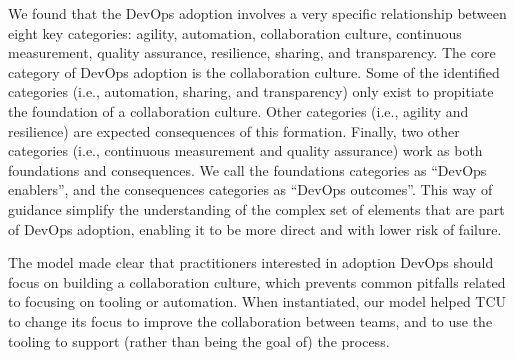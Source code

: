 


We found that the DevOps adoption involves a very specific relationship between
eight key categories: agility, automation, collaboration culture, continuous
measurement, quality assurance, resilience, sharing, and transparency. The core
category of DevOps adoption is the collaboration culture. Some of the
identified categories (i.e., automation, sharing, and transparency) only exist
to propitiate the foundation of a collaboration culture. Other categories
(i.e., agility and resilience) are expected consequences of this formation.
Finally, two other categories (i.e., continuous measurement and quality
assurance) work as both foundations and consequences. We call the foundations
categories as ``DevOps enablers'', and the consequences categories as ``DevOps outcomes''.
This way of guidance simplify the understanding of the
complex set of elements that are part of DevOps adoption, enabling it to be
more direct and with lower risk of failure.


The model made clear that practitioners interested in adoption DevOps should focus on building a
collaboration culture, which prevents common pitfalls related to focusing on
tooling or automation. When instantiated,
our model helped TCU to
change its focus to improve the collaboration between teams, and to use the tooling
to support (rather than being the goal of) the process.


%

